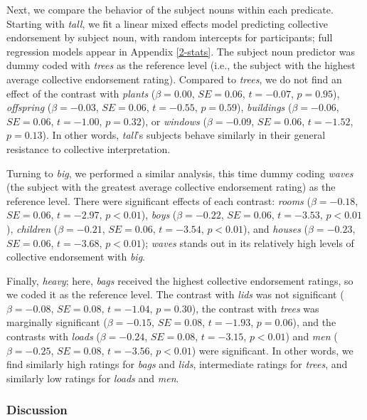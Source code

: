 \documentclass[linguex]{sp}
\newcommand{\ndg}[1]{\textcolor{Green}{[ndg: #1]}}
\begin{document}

Next, we compare the behavior of the subject nouns within each predicate.  Starting with \emph{tall}, we fit a linear mixed effects model predicting collective endorsement by subject noun, with random intercepts for participants; full regression models appear in Appendix \ref{2-stats}. The subject noun predictor was dummy coded with \emph{trees} as the reference level (i.e., the subject with the highest average collective endorsement rating). Compared to \emph{trees}, we do not find an effect of the contrast with \emph{plants} ($\beta=0.00$, $SE=0.06$, $t=-0.07$, $p=0.95$), \emph{offspring} ($\beta=-0.03$, $SE=0.06$, $t=-0.55$, $p=0.59$), \emph{buildings} ($\beta=-0.06$, $SE=0.06$, $t=-1.00$, $p=0.32$), or \emph{windows} ($\beta=-0.09$, $SE=0.06$, $t=-1.52$, $p=0.13$). In other words, \emph{tall}'s subjects behave similarly in their general resistance to collective interpretation. 

Turning to \emph{big}, we performed a similar analysis, this time dummy coding \emph{waves} (the subject with the greatest average collective endorsement rating) as the reference level. There were significant effects of each contrast: \emph{rooms} ($\beta=-0.18$, $SE=0.06$, $t=-2.97$, $p<0.01$), \emph{boys} ($\beta=-0.22$, $SE=0.06$, $t=-3.53$, $p<0.01$), \emph{children} ($\beta=-0.21$, $SE=0.06$, $t=-3.54$, $p<0.01$), and \emph{houses} ($\beta=-0.23$, $SE=0.06$, $t=-3.68$, $p<0.01$); \emph{waves} stands out in its relatively high levels of collective endorsement with \emph{big}.

Finally, \emph{heavy}; here, \emph{bags} received the highest collective endorsement ratings, so we coded it as the reference level. The contrast with \emph{lids} was not significant ($\beta=-0.08$, $SE=0.08$, $t=-1.04$, $p=0.30$), the contrast with \emph{trees} was marginally significant ($\beta=-0.15$, $SE=0.08$, $t=-1.93$, $p=0.06$), and the contrasts with \emph{loads} ($\beta=-0.24$, $SE=0.08$, $t=-3.15$, $p<0.01$) and \emph{men} ($\beta=-0.25$, $SE=0.08$, $t=-3.56$, $p<0.01$) were significant. In other words, we find similarly high ratings for \emph{bags} and \emph{lids}, intermediate ratings for \emph{trees}, and similarly low ratings for \emph{loads} and \emph{men}.

\subsubsection{Discussion}
\end{document}
